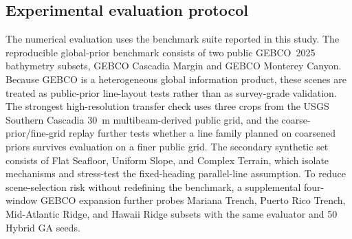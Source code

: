 \documentclass[jmse,article,submit,moreauthors]{Definitions/mdpi}
\begin{document}
\subsection{Experimental evaluation protocol}
The numerical evaluation uses the benchmark suite reported in this study. The reproducible global-prior benchmark consists of two public GEBCO~2025 bathymetry subsets, GEBCO Cascadia Margin and GEBCO Monterey Canyon. Because GEBCO is a heterogeneous global information product, these scenes are treated as public-prior line-layout tests rather than as survey-grade validation. The strongest high-resolution transfer check uses three crops from the USGS Southern Cascadia 30~m multibeam-derived public grid, and the coarse-prior/fine-grid replay further tests whether a line family planned on coarsened priors survives evaluation on a finer public grid. The secondary synthetic set consists of Flat Seafloor, Uniform Slope, and Complex Terrain, which isolate mechanisms and stress-test the fixed-heading parallel-line assumption. To reduce scene-selection risk without redefining the benchmark, a supplemental four-window GEBCO expansion further probes Mariana Trench, Puerto Rico Trench, Mid-Atlantic Ridge, and Hawaii Ridge subsets with the same evaluator and 50 Hybrid GA seeds.
\end{document}
